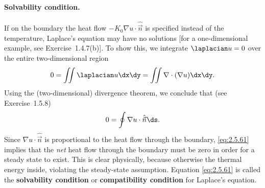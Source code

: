 \paragraph{Solvability condition.}
If on the boundary the heat flow $-K_0\nabla u\cdot\hat{\vec{n}}$ is specified instead of the temperature, Laplace's equation may have no solutions [for a one-dimensional example, see Exercise~1.4.7(b)]. To show this, we integrate $\laplacian u = 0$ over the entire two-dimensional region
\[
0 = \iint \laplacian u\dx\dy = \iint \nabla\cdot(\nabla u)\dx\dy.
\]
Using the (two-dimensional) divergence theorem, we conclude that (see Exercise~1.5.8)
\begin{equation}
\label{eq:2.5.61}
0 = \oint \nabla u\cdot\hat{\vec{n}}\ds.
\end{equation}
Since $\nabla u\cdot\hat{\vec{n}}$ is proportional to the heat flow through the boundary, \eqref{eq:2.5.61} implies that the \emph{net} heat flow through the boundary must be zero in order for a steady state to exist. This is clear physically, because otherwise the thermal energy inside, violating the steady-state assumption. Equation \eqref{eq:2.5.61} is called the \textbf{solvability condition} or \textbf{compatibility condition} for Laplace's equation.

